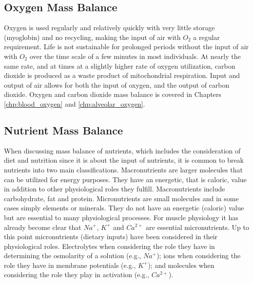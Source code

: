 \subsection{Oxygen Mass Balance}
Oxygen is used regularly and relatively quickly with very little storage (myoglobin) and no recycling, making the input of air with $O_2$ a regular requirement. Life is not sustainable for prolonged periods without the input of air with $O_2$ over the time scale of a few minutes in most individuals. At nearly the same rate, and at times at a slightly higher rate of oxygen utilization, carbon dioxide is produced as a waste product of mitochondrial respiration. Input and output of air allows for both the input of oxygen, and the output of carbon dioxide. Oxygen and carbon dioxide mass balance is covered in Chapters \ref{chp:blood_oxygen} and \ref{chp:alveolar_oxygen}.

\subsection{Nutrient Mass Balance}

When discussing mass balance of nutrients, which includes the consideration of diet and nutrition since it is about the input of nutrients, it is common to break nutrients into two main classifications. Macronutrients are larger molecules that can be utilized for energy purposes. They have an energetic, that is caloric, value in addition to other physiological roles they fulfill. Macronutrients include carbohydrate, fat and protein. Micronutrients are small molecules and in some cases simply elements or minerals. They do not have an energetic (caloric) value but are essential to many physiological processes. For muscle physiology it has already become clear that $Na^+$, $K^+$ and $Ca^{2+}$ are essential micronutrients. Up to this point micronutrients (dietary inputs) have been considered in their physiological roles. Electrolytes when considering the role they have in determining the osmolarity of a solution (e.g., $Na^+$); ions when considering the role they have in membrane potentials (e.g., $K^+$); and molecules when considering the role they play in activation (e.g., $Ca^{2+}$).

